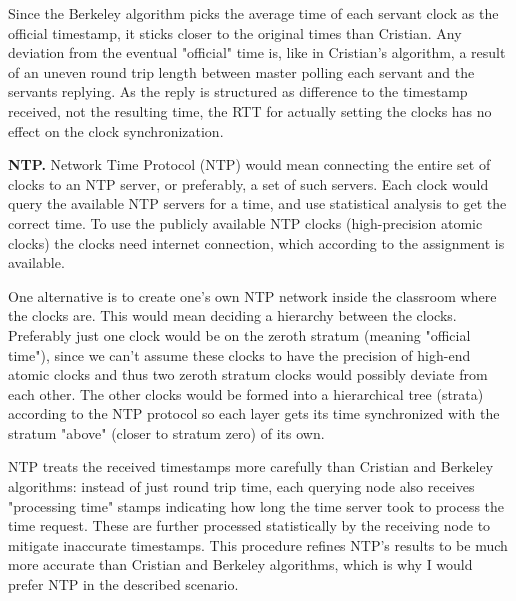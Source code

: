 \documentclass[12pt,a4paper,titlepage]{article}
\begin{document}
Since the Berkeley algorithm picks the average time of each servant clock as the official timestamp, it sticks closer to the original times than Cristian. Any deviation from the eventual "official" time is, like in Cristian's algorithm, a result of an uneven round trip length between master polling each servant and the servants replying. As the reply is structured as difference to the timestamp received, not the resulting time, the RTT for actually setting the clocks has no effect on the clock synchronization.

\textbf{NTP.} Network Time Protocol (NTP) would mean connecting the entire set of clocks to an NTP server, or preferably, a set of such servers. Each clock would query the available NTP servers for a time, and use statistical analysis to get the correct time. To use the publicly available NTP clocks (high-precision atomic clocks) the clocks need internet connection, which according to the assignment is available.

One alternative is to create one's own NTP network inside the classroom where the clocks are. This would mean deciding a hierarchy between the clocks. Preferably just one clock would be on the zeroth stratum (meaning "official time"), since we can't assume these clocks to have the precision of high-end atomic clocks and thus two zeroth stratum clocks would possibly deviate from each other. The other clocks would be formed into a hierarchical tree (strata) according to the NTP protocol so each layer gets its time synchronized with the stratum "above" (closer to stratum zero) of its own.

NTP treats the received timestamps more carefully than Cristian and Berkeley algorithms: instead of just round trip time, each querying node also receives "processing time" stamps indicating how long the time server took to process the time request. These are further processed statistically by the receiving node to mitigate inaccurate timestamps. This procedure refines NTP's results to be much more accurate than Cristian and Berkeley algorithms, which is why I would prefer NTP in the described scenario.
\end{document}
